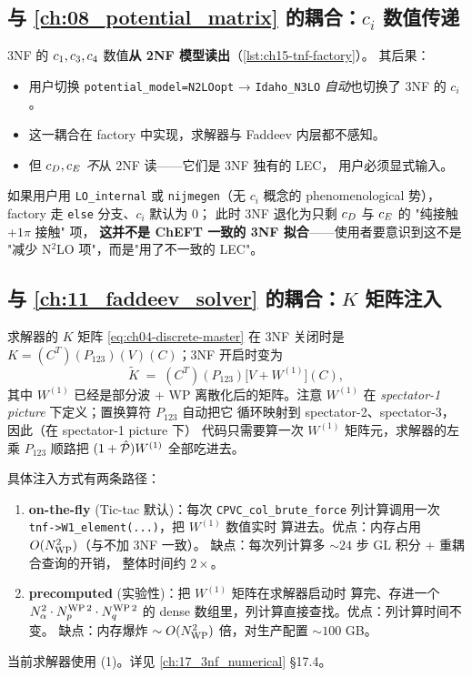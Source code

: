 \subsection{与 \cref{ch:08_potential_matrix} 的耦合：\(c_i\) 数值传递}
\label{subsec:ch15-coupling-V}

3NF 的 \(c_1, c_3, c_4\) 数值\textbf{从 2NF 模型读出}（\cref{lst:ch15-tnf-factory}）。
其后果：
\begin{itemize}
\item 用户切换 \texttt{potential\_model=N2LOopt} → \texttt{Idaho\_N3LO}
      \emph{自动}也切换了 3NF 的 \(c_i\)。
\item 这一耦合在 factory 中实现，求解器与 Faddeev 内层都不感知。
\item 但 \(c_D, c_E\) \emph{不}从 2NF 读——它们是 3NF 独有的 LEC，
      用户必须显式输入。
\end{itemize}

如果用户用 \texttt{LO\_internal} 或 \texttt{nijmegen}（无 \(c_i\) 概念的
phenomenological 势），factory 走 \texttt{else} 分支、\(c_i\) 默认为 0；
此时 3NF 退化为只剩 \(c_D\) 与 \(c_E\) 的 "纯接触+\(1\pi\) 接触" 项，
\textbf{这并不是 ChEFT 一致的 3NF 拟合}——使用者要意识到这不是
"减少 N\(^2\)LO 项"，而是"用了不一致的 LEC"。

\subsection{与 \cref{ch:11_faddeev_solver} 的耦合：\(K\) 矩阵注入}
\label{subsec:ch15-coupling-solver}

求解器的 \(K\) 矩阵 \cref{eq:ch04-discrete-master} 在 3NF 关闭时是
\(K = (C^T)(P_{123})(V)(C)\)；3NF 开启时变为
\begin{equation}
\label{eq:ch15-K-with-3NF}
\widetilde K \;=\; (C^T)(P_{123})\big[ V + W^{(1)} \big](C),
\end{equation}
其中 \(W^{(1)}\) 已经是部分波 + WP 离散化后的矩阵。注意 \(W^{(1)}\)
在 \emph{spectator-1 picture} 下定义；置换算符 \(P_{123}\) 自动把它
循环映射到 spectator-2、spectator-3，因此（在 spectator-1 picture 下）
代码只需要算一次 \(W^{(1)}\) 矩阵元，求解器的左乘 \(P_{123}\) 顺路把
\((1+\hat{\mathcal{P}}) W^{(1)}\) 全部吃进去。

具体注入方式有两条路径：
\begin{enumerate}
\item \textbf{on-the-fly} (Tic-tac 默认)：每次 \texttt{CPVC\_col\_brute\_force}
      列计算调用一次 \texttt{tnf->W1\_element(...)}，把 \(W^{(1)}\) 数值实时
      算进去。优点：内存占用 \(O(N_{\rm WP}^2)\)（与不加 3NF 一致）。
      缺点：每次列计算多 \(\sim 24\) 步 GL 积分 + 重耦合查询的开销，
      整体时间约 \(2\times\)。
\item \textbf{precomputed} (实验性)：把 \(W^{(1)}\) 矩阵在求解器启动时
      算完、存进一个 \(N_\alpha^2 \cdot N_p^{\rm WP\,2} \cdot N_q^{\rm WP\,2}\)
      的 dense 数组里，列计算直接查找。优点：列计算时间不变。
      缺点：内存爆炸 \(\sim O(N_{\rm WP}^2)\) 倍，对生产配置 \(\sim 100\) GB。
\end{enumerate}
当前求解器使用 (1)。详见 \cref{ch:17_3nf_numerical} \S 17.4。

